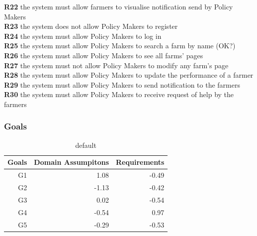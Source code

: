 \textbf{R22} the system must allow farmers to visualise notification send by Policy Makers\\
\textbf{R23} the system does not allow Policy Makers to register\\
\textbf{R24} the system must allow Policy Makers to log in\\
\textbf{R25} the system must allow Policy Makers to search a farm by name (OK?)\\
\textbf{R26} the system must allow Policy Makers to see all farms’ pages\\
\textbf{R27} the system must not allow Policy Makers to modify any farm’s page\\
\textbf{R28} the system must allow Policy Makers to update the performance of a farmer\\
\textbf{R29} the system must allow Policy Makers to send notification to the farmers\\
\textbf{R30} the system must allow Policy Makers to receive request of help by the farmers\\
\subsubsection{Goals}

\begin{table}[ht]
\caption{default}
\begin{center}
\begin{tabular}{||r||r||r||}
    \hline
   Goals & Domain Assumpitons & Requirements \\
    \hline
    G1 & 1.08 & -0.49  \\
    \hline
    G2 & -1.13 & -0.42  \\
    \hline
    G3 & 0.02 & -0.54 \\
    \hline
    G4 & -0.54 & 0.97 \\
    \hline
    G5 & -0.29 & -0.53 \\
    \hline
\end{tabular}
\end{center}
\end{table}


